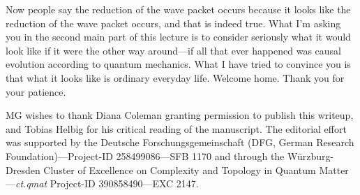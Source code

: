 \documentclass[12pt,nofootinbib]{revtex4}
\begin{document}

Now people say the reduction of the wave packet occurs because it looks like the reduction of the wave packet occurs, and that is indeed true. What I'm asking you in the second main part of this lecture is to consider seriously what it would look like if it were the other way around---if all that ever happened was causal evolution according to quantum mechanics. What I have tried to convince you is that what it looks like is ordinary everyday life. Welcome home. Thank you for your patience.






\vfill\eject\vfill %

\begin{acknowledgments}
MG wishes to thank Diana Coleman granting permission to publish this writeup, and Tobias Helbig for his critical reading of the manuscript.  The editorial effort %
was supported by the Deutsche Forschungsgemeinschaft (DFG, German Research Foundation)---Project-ID 258499086---SFB 1170 and through the W\"urzburg-Dresden Cluster of Excellence on Complexity and Topology in Quantum Matter---\textit{ct.qmat} Project-ID 390858490---EXC 2147.
\end{acknowledgments}



% 
% 
\end{document}
